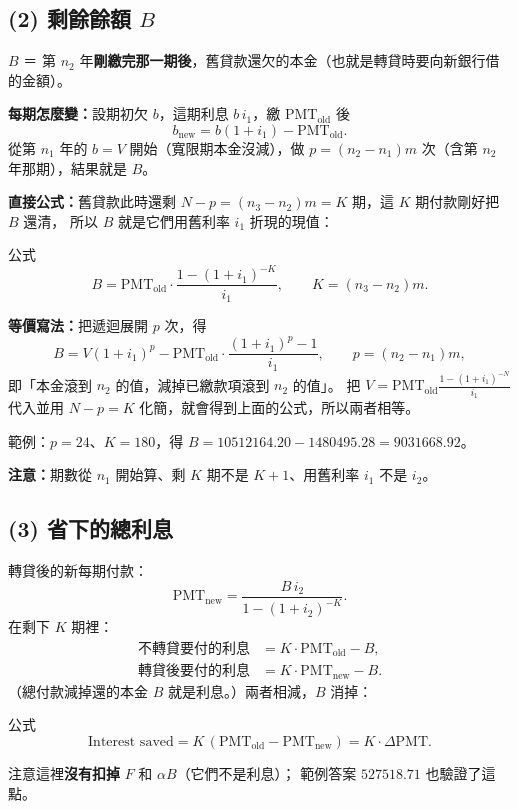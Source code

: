 \documentclass[11pt,a4paper]{article}
\begin{document}
\subsection{(2) 剩餘餘額 $B$}

$B$ ＝ 第 $n_2$ 年\textbf{剛繳完那一期後}，舊貸款還欠的本金（也就是轉貸時要向新銀行借的金額）。

\textbf{每期怎麼變：}設期初欠 $b$，這期利息 $b\,i_1$，繳 $\mathrm{PMT}_{\text{old}}$ 後
\[
  b_{\text{new}} = b(1+i_1)-\mathrm{PMT}_{\text{old}}.
\]
從第 $n_1$ 年的 $b=V$ 開始（寬限期本金沒減），做 $p=(n_2-n_1)m$ 次（含第 $n_2$ 年那期），結果就是 $B$。

\textbf{直接公式：}舊貸款此時還剩 $N-p=(n_3-n_2)m=K$ 期，這 $K$ 期付款剛好把 $B$ 還清，
所以 $B$ 就是它們用舊利率 $i_1$ 折現的現值：
\begin{keybox}{公式}
\[
  B=\mathrm{PMT}_{\text{old}}\cdot\frac{1-(1+i_1)^{-K}}{i_1},\qquad K=(n_3-n_2)m.
\]
\end{keybox}
\textbf{等價寫法：}把遞迴展開 $p$ 次，得
\[
  B=V(1+i_1)^{p}-\mathrm{PMT}_{\text{old}}\cdot\frac{(1+i_1)^{p}-1}{i_1},\qquad p=(n_2-n_1)m,
\]
即「本金滾到 $n_2$ 的值，減掉已繳款項滾到 $n_2$ 的值」。
把 $V=\mathrm{PMT}_{\text{old}}\frac{1-(1+i_1)^{-N}}{i_1}$ 代入並用 $N-p=K$ 化簡，就會得到上面的公式，所以兩者相等。

範例：$p=24$、$K=180$，得 $B=10512164.20-1480495.28=9031668.92$。

\textbf{注意：}期數從 $n_1$ 開始算、剩 $K$ 期不是 $K+1$、用舊利率 $i_1$ 不是 $i_2$。

\subsection{(3) 省下的總利息}

轉貸後的新每期付款：
\[
  \mathrm{PMT}_{\text{new}}=\frac{B\,i_2}{1-(1+i_2)^{-K}}.
\]
在剩下 $K$ 期裡：
\begin{align*}
  \text{不轉貸要付的利息} &= K\cdot\mathrm{PMT}_{\text{old}}-B,\\
  \text{轉貸後要付的利息} &= K\cdot\mathrm{PMT}_{\text{new}}-B.
\end{align*}
（總付款減掉還的本金 $B$ 就是利息。）兩者相減，$B$ 消掉：
\begin{keybox}{公式}
\[
  \text{Interest saved}=K\,(\mathrm{PMT}_{\text{old}}-\mathrm{PMT}_{\text{new}})=K\cdot\Delta\mathrm{PMT}.
\]
\end{keybox}
注意這裡\textbf{沒有扣掉} $F$ 和 $\alpha B$（它們不是利息）；
範例答案 $527518.71$ 也驗證了這點。
\end{document}

